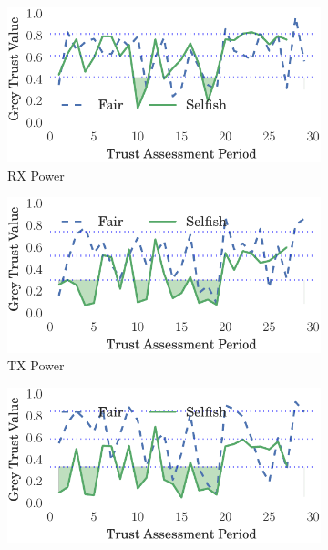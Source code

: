 \documentclass[runningheads,a4paper]{llncs}
\begin{document}
\begin{figure}
\begin{subfigure}{0.5\textwidth}
  \centering
  \includegraphics[width=.95\linewidth]{img/trust_bella_all_mobile_emph_ARXP_BadMouthingPowerControl.pdf}
  \caption{RX Power}
  \label{fig:all_mobile_badmouthing_rxp}
\end{subfigure}
\begin{subfigure}{0.5\textwidth}
\centering
  \includegraphics[width=.95\linewidth]{img/trust_bella_all_mobile_emph_ATXP_BadMouthingPowerControl.pdf}
  \caption{TX Power}
  \label{fig:all_mobile_badmouthing_txp}
\end{subfigure}
\begin{subfigure}{0.5\textwidth}
\centering
  \includegraphics[width=.95\linewidth]{img/trust_bella_all_mobile_emph_RXThroughput_BadMouthingPowerControl.pdf}

\end{subfigure}
\end{figure}
\end{document}
